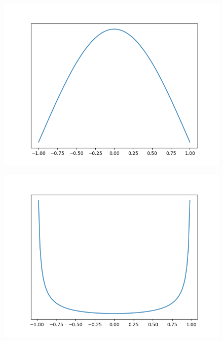 \begin{figure}[!h]
    \centering
    \includegraphics[scale=0.5]
    {./content/figures/dists/gaussian}
    \caption{}
    \label{fig:gaussian}
\end{figure}

\begin{figure}[!h]
    \centering
    \includegraphics[scale=0.5]
    {./content/figures/dists/beta_0.3_0.3}
    \caption{}
    \label{fig:beta-0.3-0.3}
\end{figure}

